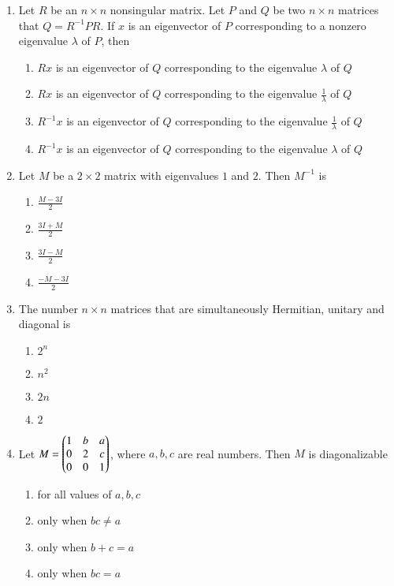 \documentclass[journal,12pt,twocolumn]{IEEEtran}
\theoremstyle{remark}
\begin{document}
\begin{enumerate}
    \item Let $R$ be an $n\times n$ nonsingular matrix. Let $P$ and $Q$ be two $n\times n$ matrices that $Q=R^{-1}PR$. If $x$ is an eigenvector of $P$ corresponding to a nonzero eigenvalue $\lambda$ of $P$, then
        \begin{enumerate}
            \item $Rx$ is an eigenvector of $Q$ corresponding to the eigenvalue $\lambda$ of $Q$
            \item $Rx$ is an eigenvector of $Q$ corresponding to the eigenvalue $\frac{1}{\lambda}$ of $Q$
            \item $R^{-1}x$ is an eigenvector of $Q$ corresponding to the eigenvalue $\frac{1}{\lambda}$ of $Q$
            \item $R^{-1}x$ is an eigenvector of $Q$ corresponding to the eigenvalue $\lambda$ of $Q$
        \end{enumerate}


    \item Let $M$ be a $2\times 2$ matrix with eigenvalues $1$ and $2$. Then $M^{-1}$ is
        \begin{enumerate}
            \item $\frac{M-3I}{2}$
            \item $\frac{3I+M}{2}$
            \item $\frac{3I-M}{2}$
            \item $\frac{-M-3I}{2}$
        \end{enumerate}

    \item The number $n\times n$ matrices that are simultaneously Hermitian, unitary and diagonal is
        \begin{enumerate}
            \item $2^n$
            \item $n^2$
            \item $2n$
            \item $2$
        \end{enumerate}

    \item Let $M=\begin{pmatrix}1&b&a \\ 0&2&c \\ 0&0&1\end{pmatrix}$, where $a,b,c$ are real numbers. Then $M$ is diagonalizable
        \begin{enumerate}
            \item for all values of $a,b,c$
            \item only when $bc\neq a$
            \item only when $b+c=a$
            \item only when $bc=a$
        \end{enumerate}


\end{enumerate}
\end{document}
